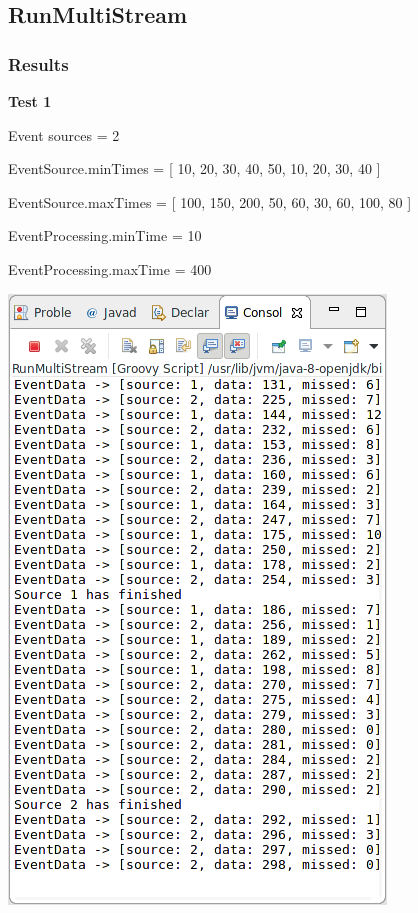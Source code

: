 \subsection{RunMultiStream}

\subsubsection*{Results}

\textbf{Test 1}

Event sources = 2

EventSource.minTimes = [ 10, 20, 30, 40, 50, 10, 20, 30, 40 ]

EventSource.maxTimes = [ 100, 150, 200, 50, 60, 30, 60, 100, 80 ]

EventProcessing.minTime = 10

EventProcessing.maxTime = 400

\includegraphics[width=\textwidth/2]{img/screenshots/9-2-1.png}
